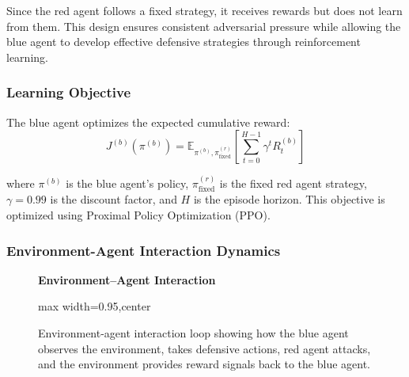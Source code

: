 \documentclass[12pt,oneside]{article}
\begin{document}
Since the red agent follows a fixed strategy, it receives rewards but does not learn from them. This design ensures consistent adversarial pressure while allowing the blue agent to develop effective defensive strategies through reinforcement learning.

\subsubsection{Learning Objective}

The blue agent optimizes the expected cumulative reward:
\begin{equation}
J^{(b)}(\pi^{(b)}) = \mathbb{E}_{\pi^{(b)}, \pi^{(r)}_{\text{fixed}}}\left[\sum_{t=0}^{H-1} \gamma^t R_t^{(b)}\right]
\end{equation}

where $\pi^{(b)}$ is the blue agent's policy, $\pi^{(r)}_{\text{fixed}}$ is the fixed red agent strategy, $\gamma = 0.99$ is the discount factor, and $H$ is the episode horizon. This objective is optimized using Proximal Policy Optimization (PPO).

\subsubsection{Environment-Agent Interaction Dynamics}

\begin{figure}[H]
\centering
\textbf{Environment--Agent Interaction}
\medskip
\begin{adjustbox}{max width=0.95\linewidth,center}
\end{adjustbox}
\caption{Environment-agent interaction loop showing how the blue agent observes the environment, takes defensive actions, red agent attacks, and the environment provides reward signals back to the blue agent.}
\label{fig:environment_interaction}
\end{figure}
\end{document}
